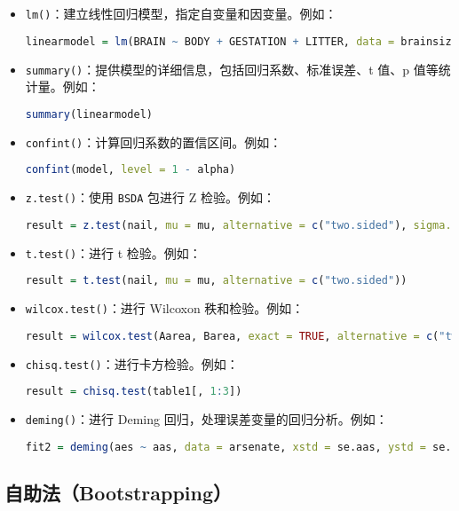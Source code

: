 \documentclass[UTF8]{report}
\theoremstyle{MyLineTheoremStyle} %
\theoremstyle{MyBlockTheoremStyle} %
\theoremstyle{MySubsubsectionStyle} %
\begin{document}
\begin{itemize}
    \item \texttt{lm()}：建立线性回归模型，指定自变量和因变量。例如：
    \begin{lstlisting}[language=R]
    linearmodel = lm(BRAIN ~ BODY + GESTATION + LITTER, data = brainsize)
    \end{lstlisting}
    \item \texttt{summary()}：提供模型的详细信息，包括回归系数、标准误差、t 值、p 值等统计量。例如：
    \begin{lstlisting}[language=R]
    summary(linearmodel)
    \end{lstlisting}
    \item \texttt{confint()}：计算回归系数的置信区间。例如：
    \begin{lstlisting}[language=R]
    confint(model, level = 1 - alpha)
    \end{lstlisting}
    \item \texttt{z.test()}：使用 \texttt{BSDA} 包进行 Z 检验。例如：
    \begin{lstlisting}[language=R]
    result = z.test(nail, mu = mu, alternative = c("two.sided"), sigma.x = sigma)
    \end{lstlisting}
    \item \texttt{t.test()}：进行 t 检验。例如：
    \begin{lstlisting}[language=R]
    result = t.test(nail, mu = mu, alternative = c("two.sided"))
    \end{lstlisting}
    \item \texttt{wilcox.test()}：进行 Wilcoxon 秩和检验。例如：
    \begin{lstlisting}[language=R]
    result = wilcox.test(Aarea, Barea, exact = TRUE, alternative = c("two.sided"))
    \end{lstlisting}
    \item \texttt{chisq.test()}：进行卡方检验。例如：
    \begin{lstlisting}[language=R]
    result = chisq.test(table1[, 1:3])
    \end{lstlisting}
    \item \texttt{deming()}：进行 Deming 回归，处理误差变量的回归分析。例如：
    \begin{lstlisting}[language=R]
    fit2 = deming(aes ~ aas, data = arsenate, xstd = se.aas, ystd = se.aes)
    \end{lstlisting}
\end{itemize}

\subsection*{自助法（Bootstrapping）}
\end{document}
